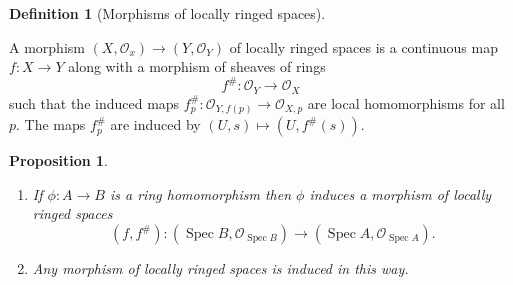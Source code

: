 \documentclass[10pt,]{book}
\theoremstyle{plain}
\newtheorem{proposition}[theorem]{Proposition}
\theoremstyle{definition}
\newtheorem{definition}[theorem]{Definition}
\numberwithin{equation}{section}
\newcommand{\sO}{\mathcal{O}}
\DeclareMathOperator{\Spec}{Spec}
\begin{document}
\begin{definition}[Morphisms of locally ringed spaces]\label{definition-6}

            A morphism \((X,\sO_x) \to (Y,\sO_Y)\) of locally ringed spaces is a continuous map \(f\colon X \to Y\) along with a morphism of sheaves of rings 
            \[
              f^\# \colon \sO_Y \to \sO_X
            \]
            such that the induced maps \(f_p^\# \colon \sO_{Y,f(p)} \to \sO_{X,p}\) are local homomorphisms for all \(p\).
            The maps \(f_p^\#\) are induced by \((U,s) \mapsto (U,f^\#(s))\). \end{definition}
\begin{proposition}\label{proposition-2}
\begin{enumerate}
\item{}If \(\phi\colon A \to B\) is a ring homomorphism then \(\phi\) induces a morphism of locally ringed spaces \[(f,f^\#)\colon (\Spec B, \sO_{\Spec B}) \to (\Spec A, \sO_{\Spec A}).\]\item{}Any morphism of locally ringed spaces is induced in this way.\end{enumerate}
\end{proposition}
\end{document}

